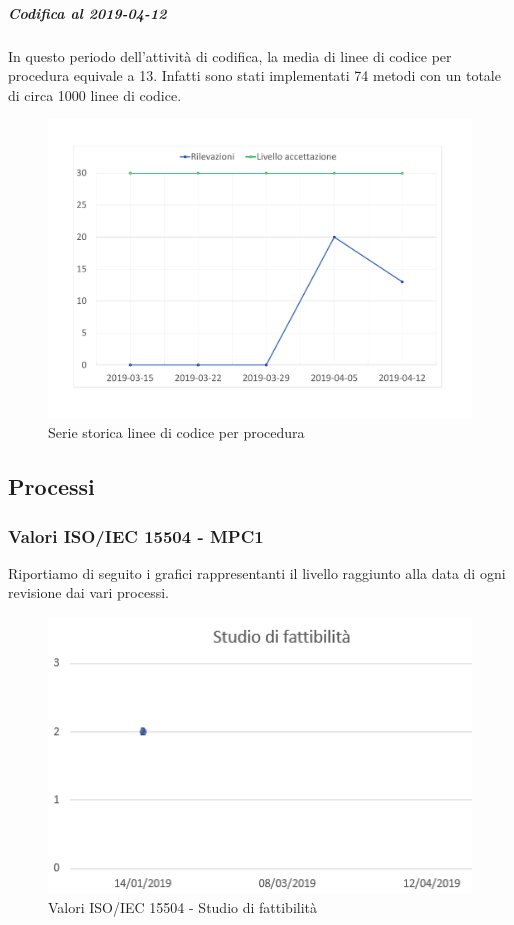 \subparagraph{Codifica al 2019-04-12}
In questo periodo dell'attività di codifica, la media di linee di codice per procedura equivale a 13. Infatti sono stati implementati 74 metodi con un totale di circa 1000 linee di codice.
\begin{figure}[H]
	\centering
	\includegraphics[scale=0.6]{images/resoconto/MPS10Chart.pdf}
	\caption{Serie storica linee di codice per procedura}	
\end{figure}

\subsection{Processi}
\subsubsection{Valori ISO/IEC 15504 - MPC1}

Riportiamo di seguito i grafici rappresentanti il livello raggiunto alla data di ogni revisione dai vari processi.


\begin{figure}[H]
	\centering
	\includegraphics[scale=1]{images/resoconto/Studio.png}
	\caption{Valori ISO/IEC 15504 - Studio di fattibilità}	
\end{figure}



